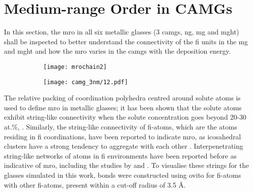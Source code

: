 %
\section{Medium-range Order in CAMGs}

\begin{changebar}
In this section, the \gls{mro} in all six metallic glasses (3 \gls{camg}s, \gls{ng}, \gls{mg} and \gls{mght}) shall be inspected to better understand the connectivity of the \gls{fi} units in the \gls{mg} and \gls{mght} and how the \gls{mro} varies in the \gls{camg}s with the deposition energy. \par

\begin{figure}[!h]
	\centering
	\begin{subfigure}[b]{0.5\textwidth} \centering
		\texttt{[image: mrochain2]}	\subcaption{}
	\end{subfigure}%
	\vfill
	\begin{subfigure}{\textwidth} \centering
		\texttt{[image: camg\_3nm/12.pdf]}	\subcaption{}
	\end{subfigure}%
	\label{f:mro-alt_camg}
\end{figure}

The relative packing of coordination polyhedra centred around solute atoms is used to define \gls{mro} in metallic glasses; it has been shown that the solute atoms exhibit string-like connectivity when the solute concentration goes beyond 20-30 at.\%, \cite{Sheng2006}. Similarly, the string-like connectivity of \gls{fi}-atoms, which are the atoms residing in \gls{fi} coordinations, have been reported to indicate \gls{mro}, as icosahedral  clusters have a strong tendency to aggregate with each other \cite{Bernal1959,Miracle2004,Li2008}. Interpenetrating string-like networks of atoms in \gls{fi} environments have been reported before as indicative of \gls{mro}, including the studies by \textcite{Lee2011} and \textcite{Ritter2011}. To visualise these strings for the glasses simulated in this work, bonds were constructed  using \gls{ovito} for \gls{fi}-atoms with other \gls{fi}-atoms, present within a cut-off radius of 3.5 \r{A}. \par 
\end{changebar}

